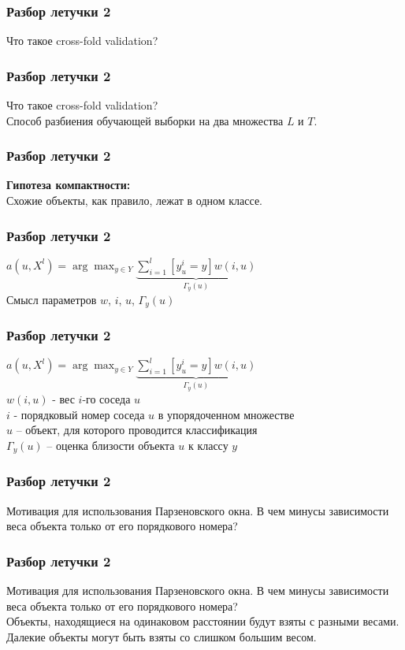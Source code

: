 \documentclass[12pt]{beamer}
\begin{document}
\begin{frame}\frametitle{Разбор летучки 2}
Что такое cross-fold validation? 
\end{frame}

\begin{frame}\frametitle{Разбор летучки 2}
Что такое cross-fold validation? \\
\vspace{5mm}
Способ разбиения обучающей выборки на два множества $L$ и $T$.
\end{frame}

\begin{frame}\frametitle{Разбор летучки 2}
\textbf{Гипотеза компактности:}\\
Схожие объекты, как правило, лежат в одном классе.\\
\end{frame}

\begin{frame}\frametitle{Разбор летучки 2}
${a(u, X^l) = \arg\max_{y \in Y} \underbrace{\sum\limits_{i=1}^l [y_u^i = y]w(i, u)}_{\Gamma_y(u)} }$\\
Смысл параметров $w$, $i$, $u$, $\Gamma_y(u)$
\end{frame}

\begin{frame}\frametitle{Разбор летучки 2}
${a(u, X^l) = \arg\max_{y \in Y} \underbrace{\sum\limits_{i=1}^l [y_u^i = y]w(i, u)}_{\Gamma_y(u)} }$\\
$w(i, u)$ - вес $i$-го соседа $u$ \\
$i$ - порядковый номер соседа $u$ в упорядоченном множестве\\
$u$ -- объект, для которого проводится классификация\\
$\Gamma_y(u)$ -- оценка близости объекта $u$ к классу ${y}$
\end{frame}

\begin{frame}\frametitle{Разбор летучки 2}
Мотивация для использования Парзеновского окна. В чем минусы зависимости веса объекта только от его порядкового номера?
\end{frame}

\begin{frame}\frametitle{Разбор летучки 2}
Мотивация для использования Парзеновского окна. В чем минусы зависимости веса объекта только от его порядкового номера?\\
\vspace{5mm}
Объекты, находящиеся на одинаковом расстоянии будут взяты с разными весами. 
Далекие объекты могут быть взяты со слишком большим весом.
\end{frame}
\end{document}
